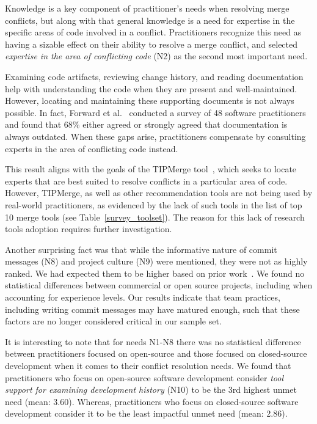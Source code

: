 Knowledge is a key component of practitioner's needs when resolving merge conflicts, but along with that general knowledge is a need for expertise in the specific areas of code involved in a conflict.
Practitioners recognize this need as having a sizable effect on their ability to resolve a merge conflict, and selected \textit{expertise in the area of conflicting code} (N2) as the second most important need.

Examining code artifacts, reviewing change history, and reading documentation help with understanding the code when they are present and well-maintained.
However, locating and maintaining these supporting documents is not always possible.
In fact, Forward et al.~\cite{forward2002documentation} conducted a survey of 48 software practitioners and found that 68\% either agreed or strongly agreed that documentation is always outdated.
When these gaps arise, practitioners compensate by consulting experts in the area of conflicting code instead.

This result aligns with the goals of the TIPMerge tool~\cite{CostaSarma}, which seeks to locate experts that are best suited to resolve conflicts in a particular area of code.
However, TIPMerge, as well as other recommendation tools are not being used by real-world practitioners, as evidenced by the lack of such tools in the list of top 10 merge tools (see Table~\ref{survey_toolset}).
The reason for this lack of research tools adoption requires further investigation.

Another surprising fact was that while the informative nature of commit messages (N8) and project culture (N9) were mentioned, they were not as highly ranked. %
We had expected them to be higher based on prior work~\cite{yamauchi2014clustering, hindle2009automatic, cortes2014automatically, hattori2008nature}. We found no statistical differences between commercial or open source projects, including when accounting for experience levels.
Our results indicate that team practices, including writing commit messages may have matured enough, such that these factors are no longer considered critical in our sample set. 


\label{oss_vs_closed_tool_support} 
It is interesting to note that for needs N1-N8 there was no statistical difference between practitioners focused on open-source and those focused on closed-source development when it comes to their conflict resolution needs.
We found that practitioners who focus on open-source software development consider \textit{tool support for examining development history} (N10) to be the 3rd highest unmet need (mean: 3.60).
Whereas, practitioners who focus on closed-source software development consider it to be the least impactful unmet need (mean: 2.86).


